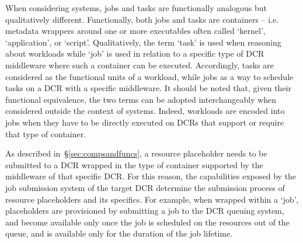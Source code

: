 \documentclass{sig-alternate}
\begin{document}
When considering \pilotjob systems, jobs and tasks are functionally analogous
but qualitatively different. Functionally, both jobs and tasks are containers --
i.e. metadata wrappers around one or more executables often called `kernel',
`application', or `script'. Qualitatively, the term `task' is used when
reasoning about workloads while `job' is used in relation to a specific type of
DCR middleware where such a container can be executed.  Accordingly, tasks are
considered as the functional units of a workload, while jobs as a way to
schedule tasks on a DCR with a specific middleware.    It should be noted
that, given their functional equivalence, the two terms can be adopted
interchangeably when considered outside the context of \pilotjob
systems. Indeed, workloads are encoded into jobs when they have to be directly
executed on DCRs that support or require that type of container.


As described in~\S\ref{sec:compsandfuncs}, a resource placeholder needs to be
submitted to a DCR wrapped in the type of container supported by the middleware
of that specific DCR. For this reason, the capabilities exposed by the job
submission system of the target DCR determine the submission process of resource
placeholders and its specifics.
For example, when wrapped within a `job', placeholders are provisioned by
submitting a job to the DCR queuing system, and become available only once the
job is scheduled on the resources out of the queue, and is available only for
the duration of the job lifetime.


\end{document}
